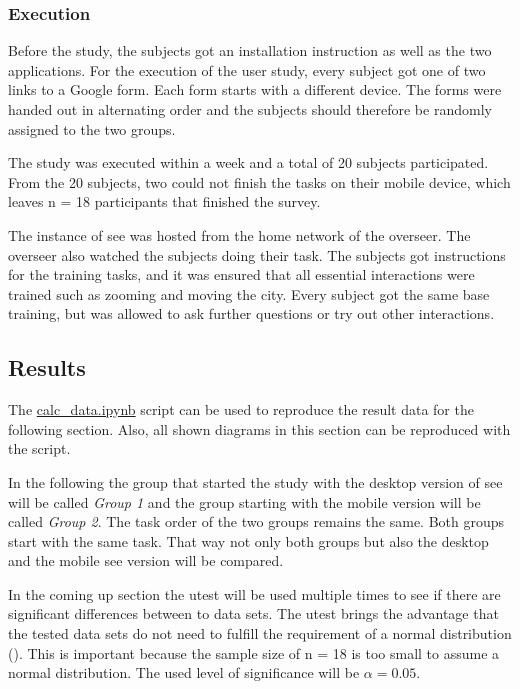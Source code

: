 \subsubsection{Execution}
Before the study, the subjects got an installation instruction as well as the two applications.
For the execution of the user study, every subject got one of two links to a Google form.
Each form starts with a different device. 
The forms were handed out in alternating order and the subjects should therefore be randomly assigned to the two groups.

The study was executed within a week and a total of 20 subjects participated.
From the 20 subjects, two could not finish the tasks on their mobile device, which leaves n = 18 participants that finished the survey.

The instance of \gls{see} was hosted from the home network of the overseer. 
The overseer also watched the subjects doing their task.
The subjects got instructions for the training tasks, and it was ensured that all essential interactions were trained such as zooming and moving the \gls{city}.
Every subject got the same base training, but was allowed to ask further questions or try out other interactions.


\subsection{Results}
The \hyperref[calc]{calc\_data.ipynb} script can be used to reproduce the result data for the following section.
Also, all shown diagrams in this section can be reproduced with the script.

In the following the group that started the study with the desktop version of \gls{see} will be called \textit{Group 1} and the group starting with the mobile version will be called \textit{Group 2}.
The task order of the two groups remains the same.
Both groups start with the same task.
That way not only both groups but also the desktop and the mobile \gls{see} version will be compared. 

In the coming up section the \gls{utest} will be used multiple times to see if there are significant differences between to data sets.
The \gls{utest} brings the advantage that the tested data sets do not need to fulfill the requirement of a normal distribution (\cite{gibbons1991comparisons}).
This is important because the sample size of n = 18 is too small to assume a normal distribution.
The used level of significance will be $\alpha = 0.05$.

